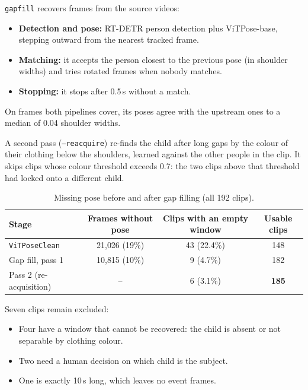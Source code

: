 \documentclass[11pt]{article}
\newcommand{\code}[1]{\texttt{#1}}
\newcommand{\best}[1]{\textbf{#1}}
\begin{document}
\code{gapfill} recovers frames from the source videos:
\begin{itemize}
  \item \textbf{Detection and pose:} RT-DETR person detection plus ViTPose-base, stepping outward from the nearest tracked frame.
  \item \textbf{Matching:} it accepts the person closest to the previous pose (in shoulder widths) and tries rotated frames when nobody matches.
  \item \textbf{Stopping:} it stops after 0.5\,s without a match.
\end{itemize}
On frames both pipelines cover, its poses agree with the upstream ones to a median of 0.04 shoulder widths.

A second pass (\code{--reacquire}) re-finds the child after long gaps by the colour of their clothing below the shoulders, learned against the other people in the clip. It skips clips whose colour threshold exceeds 0.7: the two clips above that threshold had locked onto a different child.

\begin{table}[h]
\centering
\caption{Missing pose before and after gap filling (all 192 clips).}
\begin{tabular}{lccc}
\toprule
Stage & Frames without pose & Clips with an empty window & Usable clips \\
\midrule
\code{ViTPoseClean} & 21{,}026 (19\%) & 43 (22.4\%) & 148 \\
Gap fill, pass 1 & 10{,}815 (10\%) & 9 (4.7\%) & 182 \\
Pass 2 (re-acquisition) & -- & 6 (3.1\%) & \best{185} \\
\bottomrule
\end{tabular}
\end{table}

Seven clips remain excluded:
\begin{itemize}
  \item Four have a window that cannot be recovered: the child is absent or not separable by clothing colour.
  \item Two need a human decision on which child is the subject.
  \item One is exactly 10\,s long, which leaves no event frames.
\end{itemize}
\end{document}
